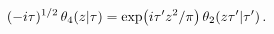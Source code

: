\[(-i\tau)^{1/2}\mathop{\theta_{4}\/}\nolimits\!\left(z\middle|\tau\right)=%
\mathop{\exp\/}\nolimits\!\left(i\tau^{\prime}z^{2}/\pi\right)\mathop{\theta_{%
2}\/}\nolimits\!\left(z\tau^{\prime}\middle|\tau^{\prime}\right).\]